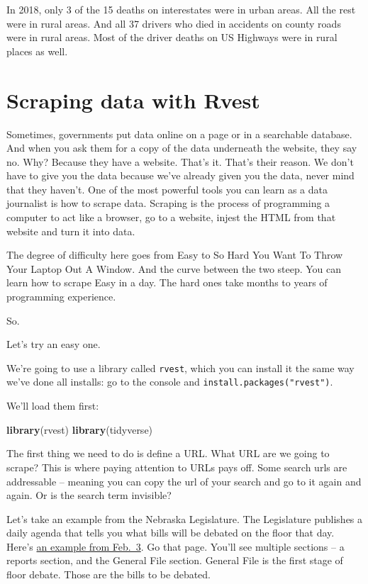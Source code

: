 \documentclass[]{book}
\newenvironment{Shaded}{\begin{snugshade}}{\end{snugshade}}
\newcommand{\KeywordTok}[1]{\textcolor[rgb]{0.13,0.29,0.53}{\textbf{#1}}}
\newcommand{\NormalTok}[1]{#1}
\begin{document}
In 2018, only 3 of the 15 deaths on interestates were in urban areas. All the rest were in rural areas. And all 37 drivers who died in accidents on county roads were in rural areas. Most of the driver deaths on US Highways were in rural places as well.

\hypertarget{scraping-data-with-rvest}{%
\chapter{Scraping data with Rvest}\label{scraping-data-with-rvest}}

Sometimes, governments put data online on a page or in a searchable database. And when you ask them for a copy of the data underneath the website, they say no. Why? Because they have a website. That's it. That's their reason. We don't have to give you the data because we've already given you the data, never mind that they haven't.
One of the most powerful tools you can learn as a data journalist is how to scrape data. Scraping is the process of programming a computer to act like a browser, go to a website, injest the HTML from that website and turn it into data.

The degree of difficulty here goes from Easy to So Hard You Want To Throw Your Laptop Out A Window. And the curve between the two steep. You can learn how to scrape Easy in a day. The hard ones take months to years of programming experience.

So.

Let's try an easy one.

We're going to use a library called \texttt{rvest}, which you can install it the same way we've done all installs: go to the console and \texttt{install.packages("rvest")}.

We'll load them first:

\begin{Shaded}
\begin{Highlighting}[]
\KeywordTok{library}\NormalTok{(rvest)}
\KeywordTok{library}\NormalTok{(tidyverse)}
\end{Highlighting}
\end{Shaded}

The first thing we need to do is define a URL. What URL are we going to scrape? This is where paying attention to URLs pays off. Some search urls are addressable -- meaning you can copy the url of your search and go to it again and again. Or is the search term invisible?

Let's take an example from the Nebraska Legislature. The Legislature publishes a daily agenda that tells you what bills will be debated on the floor that day. Here's \href{https://nebraskalegislature.gov/calendar/agenda.php?day=2020-02-03}{an example from Feb.~3}. Go that page. You'll see multiple sections -- a reports section, and the General File section. General File is the first stage of floor debate. Those are the bills to be debated.
\end{document}
